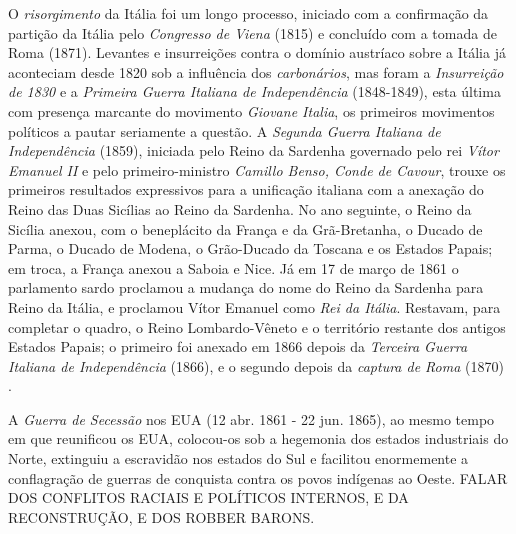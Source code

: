 O \textit{risorgimento} da Itália foi um longo processo, iniciado com a confirmação da partição da Itália pelo \textit{Congresso de Viena} (1815) e concluído com a tomada de Roma (1871). Levantes e insurreições contra o domínio austríaco sobre a Itália já aconteciam desde 1820 sob a influência dos \textit{carbonários}, mas foram a \textit{Insurreição de 1830} e a \textit{Primeira Guerra Italiana de Independência} (1848-1849), esta última com presença marcante do movimento \textit{Giovane Italia}, os primeiros movimentos políticos a pautar seriamente a questão. A \textit{Segunda Guerra Italiana de Independência} (1859), iniciada pelo Reino da Sardenha governado pelo rei \textit{Vítor Emanuel II} e pelo primeiro-ministro \textit{Camillo Benso, Conde de Cavour}, trouxe os primeiros resultados expressivos para a unificação italiana com a anexação do Reino das Duas Sicílias ao Reino da Sardenha. No ano seguinte, o Reino da Sicília anexou, com o beneplácito da França e da Grã-Bretanha, o Ducado de Parma, o Ducado de Modena, o Grão-Ducado da Toscana e os Estados Papais; em troca, a França anexou a Saboia e Nice. Já em 17 de março de 1861 o parlamento sardo proclamou a mudança do nome do Reino da Sardenha para Reino da Itália, e proclamou Vítor Emanuel como \textit{Rei da Itália}. Restavam, para completar o quadro, o Reino Lombardo-Vêneto e o território restante dos antigos Estados Papais; o primeiro foi anexado em 1866 depois da \textit{Terceira Guerra Italiana de Independência} (1866), e o segundo depois da \textit{captura de Roma} (1870) \cite{hobsbawm_capital_1977}.

A \textit{Guerra de Secessão} nos EUA (12 abr. 1861 - 22 jun. 1865), ao mesmo tempo em que reunificou os EUA, colocou-os sob a hegemonia dos estados industriais do Norte, extinguiu a escravidão nos estados do Sul e facilitou enormemente a conflagração de guerras de conquista contra os povos indígenas ao Oeste. FALAR DOS CONFLITOS RACIAIS E POLÍTICOS INTERNOS, E DA RECONSTRUÇÃO, E DOS ROBBER BARONS.

